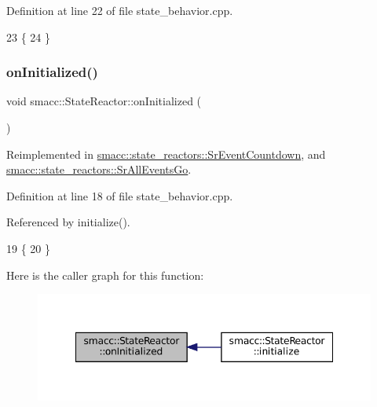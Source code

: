 Definition at line 22 of file state\+\_\+behavior.\+cpp.


\begin{DoxyCode}
23 \{
24 \}
\end{DoxyCode}
\mbox{\label{classsmacc_1_1StateReactor_aa10b2c6b7d1e80f01b00cbdac526a2bf}} 
\subsubsection{\texorpdfstring{on\+Initialized()}{onInitialized()}}
{\footnotesize\ttfamily void smacc\+::\+State\+Reactor\+::on\+Initialized (\begin{DoxyParamCaption}{ }\end{DoxyParamCaption})\hspace{0.3cm}{\ttfamily [virtual]}}



Reimplemented in \hyperlink{classsmacc_1_1state__reactors_1_1SrEventCountdown_a1bd7afbf283ade29f9305f0c3a64ef94}{smacc\+::state\+\_\+reactors\+::\+Sr\+Event\+Countdown}, and \hyperlink{classsmacc_1_1state__reactors_1_1SrAllEventsGo_adda075f2b3ec56115d02e9fb1a1c26fe}{smacc\+::state\+\_\+reactors\+::\+Sr\+All\+Events\+Go}.



Definition at line 18 of file state\+\_\+behavior.\+cpp.



Referenced by initialize().


\begin{DoxyCode}
19 \{
20 \}
\end{DoxyCode}
Here is the caller graph for this function\+:
\nopagebreak
\begin{figure}[H]
\begin{center}
\leavevmode
\includegraphics[width=348pt]{classsmacc_1_1StateReactor_aa10b2c6b7d1e80f01b00cbdac526a2bf_icgraph}
\end{center}
\end{figure}
\mbox{\label{classsmacc_1_1StateReactor_ae9d0dd0c8cdcc57f8881f0962040c8ed}} 
